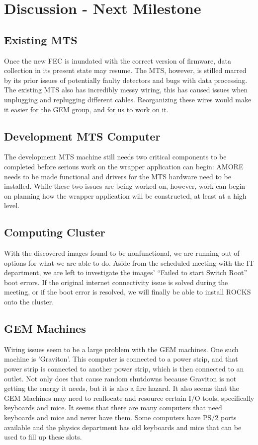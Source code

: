 \documentclass[12pt]{article}
\newcommand\tab[1][1cm]{\hspace*{#1}}
\begin{document}
\section{Discussion - Next Milestone}

\subsection{Existing MTS}

\tab Once the new FEC is inundated with the correct version of firmware, data
collection in its present state may resume. The MTS, however, is stilled marred
by its prior issues of potentially faulty detectors and bugs with data
processing. The existing MTS also has incredibly messy wiring, this has caused issues when unplugging and replugging different cables. Reorganizing these wires would make it easier for the GEM group, and for us to work on it. 

\subsection{Development MTS Computer}

\tab The development MTS machine still needs two critical components to be
completed before serious work on the wrapper application can begin: AMORE needs
to be made functional and drivers for the MTS hardware need to be
installed. While these two issues are being worked on, however, work can begin
on planning how the wrapper application will be constructed, at least at a high
level.

\subsection{Computing Cluster}

\tab With the discovered images found to be nonfunctional, we are running out of
options for what we are able to do. Aside from the scheduled meeting with the IT
department, we are left to investigate the images' ``Failed to start Switch
Root'' boot errors. If the original internet connectivity issue is solved during
the meeting, or if the boot error is resolved, we will finally be able to
install ROCKS onto the cluster.

\subsection{GEM Machines}
\tab Wiring issues seem to be a large problem with the GEM machines. One such machine is 'Graviton'. This computer is connected to a power strip, and that power strip is connected to another power strip, which is then connected to an outlet. Not only does that cause random shutdowns because Graviton is not getting the energy it needs, but it is also a fire hazard. It also seems that the GEM Machines may need to reallocate and resource certain I/O tools, specifically keyboards and mice. It seems that there are many computers that need keyboards and mice and never have them. Some computers have PS/2 ports available and the physics department has old keyboards and mice that can be used to fill up these slots.  
\end{document}
